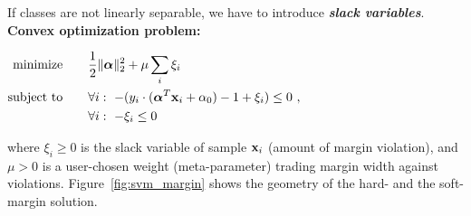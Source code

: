  If classes are not linearly separable, we have to introduce  \textbf {\emph{slack variables}}. \\ 
\textbf {Convex optimization problem:}
  
  \begin{center}
        $\begin{aligned}
           \displaystyle 
           \mbox{minimize}    &\qquad \frac{1}{2} {\|\bm{\mathrm{\alpha}}\|^2_2} + \mu \sum_i \xi_i \\
            \mbox{subject to} &\qquad \forall i:~ -(y_i\cdot (\bm{\mathrm{\alpha}}^T\bm{\mathrm{x}}_i + \alpha_0) -1+\xi_i) \leq 0~,\\
                              &\qquad \forall i:~ -\xi_i \leq 0
        \end{aligned}$
  \end{center}
  
{\small where $\xi_i\geq 0$ is the slack variable of sample $\bm{\mathrm{x}}_i$ (amount of margin violation), and $\mu>0$ is a user-chosen weight (meta-parameter) trading margin width against violations.}
Figure~\ref{fig:svm_margin} shows the geometry of the hard- and the soft-margin solution.

